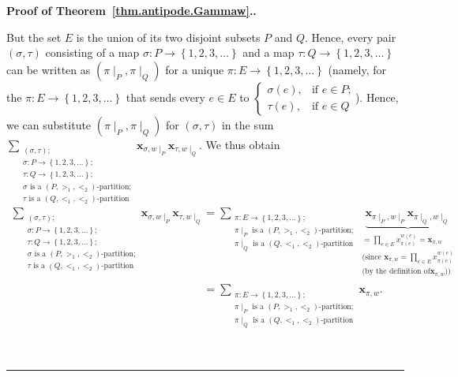 \documentclass[numbers=enddot,12pt,final,onecolumn,notitlepage,abstracton]{scrartcl}
\theoremstyle{definition}
\newenvironment{proof}[1][Proof]{\noindent\textbf{#1.} }{\ \rule{0.5em}{0.5em}}
\let\sumnonlimits\sum
\let\prodnonlimits\prod
\renewcommand{\sum}{\sumnonlimits\limits}
\renewcommand{\prod}{\prodnonlimits\limits}
\newenvironment{verlong}{}{}
\newcommand{\xx}{{\mathbf{x}}}
\begin{document}
\begin{proof}[Proof of Theorem~\ref{thm.antipode.Gammaw}.]
\begin{verlong}
{But the set $E$ is the union of its two disjoint subsets $P$ and $Q$. Hence,
every pair $\left(  \sigma,\tau\right)  $ consisting of a map $\sigma
:P\rightarrow\left\{  1,2,3,\ldots\right\}  $ and a map $\tau:Q\rightarrow
\left\{  1,2,3,\ldots\right\}  $ can be written as $\left(  \pi\mid_{P}%
,\pi\mid_{Q}\right)  $ for a unique $\pi:E\rightarrow\left\{  1,2,3,\ldots
\right\}  $ (namely, for the $\pi:E\rightarrow\left\{  1,2,3,\ldots\right\}  $
that sends every $e \in E$ to
$\begin{cases}
\sigma\left(e\right), & \text{if } e \in P \text{;}\\
\tau\left(e\right), & \text{if } e \in Q
\end{cases}$). Hence, we can substitute
$\left(  \pi\mid_{P},\pi\mid_{Q}\right)  $ for $\left(  \sigma,\tau\right)  $
in the sum $\sum_{\substack{\left(\sigma, \tau\right); \\
                \sigma : P \to \left\{1, 2, 3, \ldots\right\}; \\
                \tau : Q \to \left\{1, 2, 3, \ldots\right\}; \\
                \sigma \text{ is a }\left(P, >_1, <_2\right)\text{-partition;} \\
                \tau \text{ is a }\left(Q, <_1, <_2\right)\text{-partition}}}
\xx_{\sigma, w\mid_P} \xx_{\tau, w\mid_Q}
$. We thus obtain
\begin{align*}
\sum_{\substack{\left(\sigma, \tau\right); \\
                \sigma : P \to \left\{1, 2, 3, \ldots\right\}; \\
                \tau : Q \to \left\{1, 2, 3, \ldots\right\}; \\
                \sigma \text{ is a }\left(P, >_1, <_2\right)\text{-partition;} \\
                \tau \text{ is a }\left(Q, <_1, <_2\right)\text{-partition}}}
\xx_{\sigma, w\mid_P} \xx_{\tau, w\mid_Q}
& =\sum_{\substack{\pi:E\rightarrow\left\{  1,2,3,\ldots\right\} ; \\\pi
\mid_{P}\text{ is a }\left(  P,>_{1},<_{2}\right)  \text{-partition;}\\\pi
\mid_{Q}\text{ is a }\left(  Q,<_{1},<_{2}\right)  \text{-partition}%
}}\underbrace{\xx_{\pi\mid_{P},w\mid_{P}}{\xx}_{\pi\mid
_{Q},w\mid_{Q}}}_{\substack{=\prod_{e\in E}x_{\pi\left(  e\right)  }^{w\left(
e\right)  } = \xx_{\pi,w}\\\text{(since }\xx_{\pi,w}=\prod_{e\in
E}x_{\pi\left(  e\right)  }^{w\left(  e\right)  }\\\text{(by the definition of
}\xx_{\pi,w}\text{))}}}\\
& =\sum_{\substack{\pi:E\rightarrow\left\{  1,2,3,\ldots\right\} ; \\\pi
\mid_{P}\text{ is a }\left(  P,>_{1},<_{2}\right)  \text{-partition;}\\\pi
\mid_{Q}\text{ is a }\left(  Q,<_{1},<_{2}\right)  \text{-partition}%
}}\xx_{\pi,w}.
\end{align*}

}
\end{verlong}
\end{proof}
\end{document}

